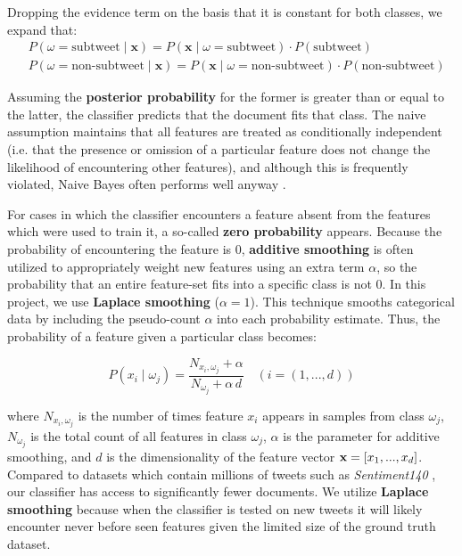 \documentclass[11pt, twoside, reqno]{book}
\begin{document}
\noindent 
Dropping the evidence term on the basis that it is constant for both classes, we expand that:
\[
\begin{split} 
	&  P(\omega = \text{subtweet} \mid \textbf{x}) = P(\textbf{x} \mid \omega = \text{subtweet}) \cdot P(\text{subtweet}) \\
	&  P(\omega = \text{non-subtweet} \mid \textbf{x}) = P(\textbf{x} \mid \omega = \text{non-subtweet}) \cdot P(\text{non-subtweet})
\end{split} 
\]

\noindent
Assuming the \textbf{posterior probability} for the former is greater than or equal to the latter, the classifier predicts that the document fits that class. The naive assumption maintains that all features are treated as conditionally independent (i.e. that the presence or omission of a particular feature does not change the likelihood of encountering other features), and although this is frequently violated, Naive Bayes often performs well anyway \cite{naive_bayes_optimality}. 

For cases in which the classifier encounters a feature absent from the features which were used to train it, a so-called \textbf{zero probability} appears. Because the probability of encountering the feature is 0, \textbf{additive smoothing} is often utilized to appropriately weight new features using an extra term $\alpha$, so the probability that an entire feature-set fits into a specific class is not 0. In this project, we use \textbf{Laplace smoothing} ($\alpha=1$). This technique smooths categorical data by including the pseudo-count $\alpha$ into each probability estimate. Thus, the probability of a feature given a particular class becomes:

\[P(x_i \mid \omega_j) = \frac{N_{x_i, \omega_j}+\alpha}{N_{\omega_j} + \alpha \, d}  \quad (i = (1, ... , d))\]

\noindent 
where $N_{x_i, \omega_j}$ is the number of times feature $x_i$ appears in samples from class $\omega_j$, $N_{\omega_j}$ is the total count of all features in class $\omega_j$, $\alpha$ is the parameter for additive smoothing, and $d$ is the dimensionality of the feature vector $\textbf x = [x_1, ..., x_d]$. Compared to datasets which contain millions of tweets such as \textit{Sentiment140} \cite{go_dataset}, our classifier has access to significantly fewer documents. We utilize \textbf{Laplace smoothing} because when the classifier is tested on new tweets it will likely encounter never before seen features given the limited size of the ground truth dataset.
\end{document}
